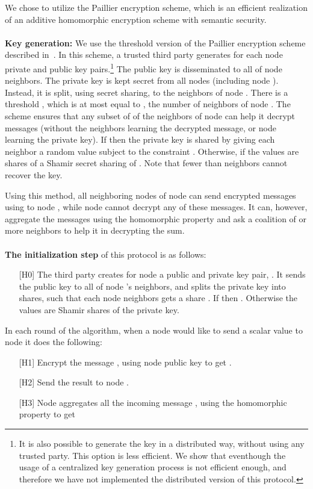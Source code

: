 \documentclass[10pt]{svjour3}
\begin{document}
We chose to utilize the Paillier encryption scheme, which is an
efficient realization of an additive homomorphic encryption scheme
with
semantic security.\\
\\
{\bf Key generation: } We use the threshold version of the
Paillier encryption scheme described in~\cite{Paillier2}. In this
scheme, a trusted third party generates for each node  private
and public key pairs.\footnote{It is also possible to generate the key
  in a distributed way, without using any trusted  party. This option
  is less efficient. We  show that eventhough the usage of a
  centralized key generation process is not efficient enough, and
  therefore we have not implemented the distributed version of this protocol.}
  The public key is disseminated to all of
node  neighbors. The private key  is kept
secret from all nodes (including node ). Instead, it is split,
using secret sharing, to the neighbors of node . There is a
threshold , which is at most equal to , the number of
neighbors of node . The scheme ensures that any subset of 
of the neighbors of node  can help it decrypt messages (without
the neighbors learning the decrypted message, or node  learning
the private key). If  then the private key is shared by
giving each neighbor  a random value  subject to the
constraint . Otherwise,
if  the values  are shares of a Shamir secret
sharing of . Note that fewer than  neighbors cannot
recover the key.


Using this method, all neighboring nodes of node  can send
encrypted messages using  to node , while node  cannot
decrypt any of these messages. It can, however,
aggregate the messages using the homomorphic property and ask a  coalition
of  or more neighbors to help it in decrypting the sum.\\
\\
{\bf The initialization step} of this protocol is as follows:
\begin{itemize}
\item [{[H0]}] The third party creates for node  a public and private key
  pair, . It sends the public key  to all
  of node 's neighbors, and splits  the private key into
  shares, such that each node  neighbors gets a share
  . If  then
 . Otherwise the 
 values are Shamir shares of the private key.
\end{itemize}


 In each round of the algorithm,
when a node  would like to send a scalar value  to node
 it does the following:
\begin{itemize}
    \item [{[H1]}] Encrypt the message , using node  public
    key to get .
    \item [{[H2]}] Send the result  to node .
    \item [{[H3]}] Node  aggregates all the incoming message , using the homomorphic
    property to get \\
\end{itemize}
\end{document}
